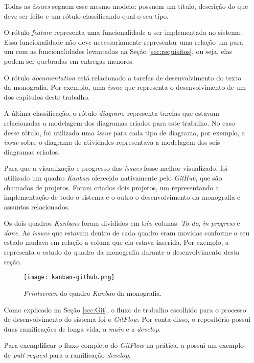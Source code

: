 Todas as \textit{issues} seguem esse mesmo modelo: possuem um título, descrição do que deve ser feito e um rótulo classificando qual o seu tipo.

O rótulo \textit{feature} representa uma funcionalidade a ser implementada no sistema. Essa funcionalidade não deve necessariamente representar uma relação um para um com as funcionalidades levantadas na Seção \ref{sec:requisitos}, ou seja, elas podem ser quebradas em entregas menores.

O rótulo \textit{documentation} está relacionado a tarefas de desenvolvimento do texto da monografia. Por exemplo, uma \textit{issue} que representa o desenvolvimento de um dos capítulos deste trabalho.

A última classificação, o rótulo \textit{diagram}, representa tarefas que estavam relacionadas a modelagem dos diagramas criados para este trabalho. No caso desse rótulo, foi utilizado uma \textit{issue} para cada tipo de diagrama, por exemplo, a \textit{issue} sobre o diagrama de atividades representava a modelagem dos seis diagramas criados. 

Para que a visualização e progresso das \textit{issues} fosse melhor visualizado, foi utilizado um quadro \textit{Kanban} oferecido nativamente pelo \textit{GitHub}, que são chamados de projetos. Foram criados dois projetos, um representando a implementação de todo o sistema e o outro o desenvolvimento da monografia e assuntos relacionados.

Os dois quadros \textit{Kanbans} foram divididos em três colunas: \textit{To do}, \textit{in progress} e \textit{done}. As \textit{issues} que estavam dentro de cada quadro eram movidas conforme o seu estado mudava em relação a coluna que ela estava inserida. Por exemplo, a  representa o estado do quadro da monografia durante o desenvolvimento desta seção.

\begin{figure}[!htb]
  \centering
  \texttt{[image: kanban-github.png]}
  \caption{\textit{Printscreen} do quadro \textit{Kanban} da monografia.}
  \label{fig:kanbanmono}
\end{figure}

Como explicado na Seção \ref{sec:Git}, o fluxo de trabalho escolhido para o processo de desenvolvimento do sistema foi o \textit{GitFlow}. Por conta disso, o repositório possui duas ramificações de longa vida, a \textit{main} e a \textit{develop}.

Para exemplificar o fluxo completo do \textit{GitFlow} na prática, a  possui um exemplo de \textit{pull request} para a ramificação \textit{develop}.

